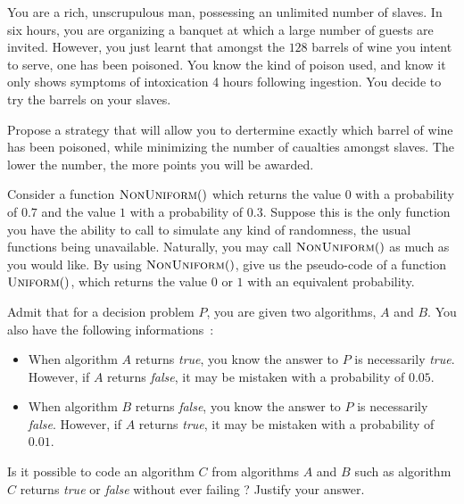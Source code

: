 \documentclass[12pt,addpoints]{exam}
\begin{document}
\begin{questions}
\question
You are a rich, unscrupulous man, possessing an unlimited number of slaves.
In six hours, you are organizing a banquet at which a large number of guests are invited.
However, you just learnt that amongst the $128$ barrels of wine you intent to serve, one has been poisoned.
You know the kind of poison used, and know it only shows symptoms of intoxication 4 hours following ingestion.
You decide to try the barrels on your slaves.

Propose a strategy that will allow you to dertermine exactly which barrel of wine has been poisoned, while minimizing the number of caualties amongst slaves. The lower the number, the more points you will be awarded.


\question
Consider a function $\Call{NonUniform}$ which returns the value $0$ with a probability of $0.7$ and the value $1$ with a probability of $0.3$.
Suppose this is the only function you have the ability to call to simulate any kind of randomness, the usual functions being unavailable.
Naturally, you may call $\Call{NonUniform}$ as much as you would like.
By using $\Call{NonUniform}$, give us the pseudo-code of a function $\Call{Uniform}$, which returns the value $0$ or $1$ with an equivalent probability.
\begin{solution}
\end{solution}

\question
Admit that for a decision problem $P$, you are given two algorithms, $A$ and $B$.
You also have the following informations~:
\begin{itemize}
  \item When algorithm $A$ returns \emph{true}, you know the answer to $P$ is necessarily \emph{true}. However, if $A$ returns \emph{false}, it may be mistaken with a probability of $0.05$.
  \item When algorithm $B$ returns \emph{false}, you know the answer to $P$ is necessarily \emph{false}. However, if $A$ returns \emph{true}, it may be mistaken with a probability of $0.01$.
\end{itemize}
Is it possible to code an algorithm $C$ from algorithms $A$ and $B$ such as algorithm $C$ returns \emph{true} or \emph{false} without ever failing ? Justify your answer.


\end{questions}
\end{document}
